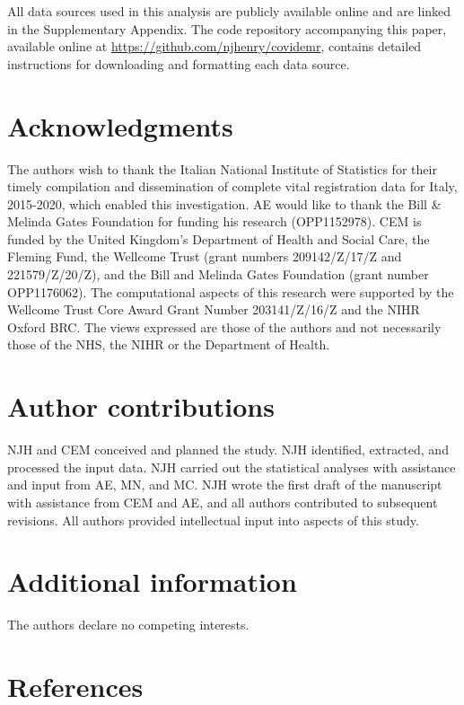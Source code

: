 \documentclass[
]{article}
\begin{document}
All data sources used in this analysis are publicly available online and are linked in the Supplementary Appendix. The code repository accompanying this paper, available online at \url{https://github.com/njhenry/covidemr}, contains detailed instructions for downloading and formatting each data source.

\hypertarget{acknowledgments}{%
\section{Acknowledgments}\label{acknowledgments}}

The authors wish to thank the Italian National Institute of Statistics for their timely compilation and dissemination of complete vital registration data for Italy, 2015-2020, which enabled this investigation. AE would like to thank the Bill \& Melinda Gates Foundation for funding his research (OPP1152978). CEM is funded by the United Kingdom's Department of Health and Social Care, the Fleming Fund, the Wellcome Trust (grant numbers 209142/Z/17/Z and 221579/Z/20/Z), and the Bill and Melinda Gates Foundation (grant number OPP1176062). The computational aspects of this research were supported by the Wellcome Trust Core Award Grant Number 203141/Z/16/Z and the NIHR Oxford BRC. The views expressed are those of the authors and not necessarily those of the NHS, the NIHR or the Department of Health.

\hypertarget{author-contributions}{%
\section{Author contributions}\label{author-contributions}}

NJH and CEM conceived and planned the study. NJH identified, extracted, and processed the input data. NJH carried out the statistical analyses with assistance and input from AE, MN, and MC. NJH wrote the first draft of the manuscript with assistance from CEM and AE, and all authors contributed to subsequent revisions. All authors provided intellectual input into aspects of this study.

\hypertarget{additional-information}{%
\section{Additional information}\label{additional-information}}

The authors declare no competing interests.

\hypertarget{references}{%
\section{References}\label{references}}
\end{document}

